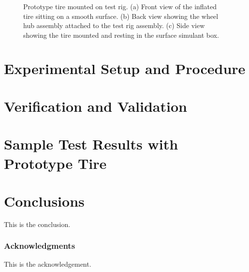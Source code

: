 \documentclass{article}
\begin{document}
\begin{figure}[hbt!]
\begin{minipage}{0.32\textwidth}
    \end{minipage}
        \begin{minipage}{0.32\textwidth}
        \centering
    \end{minipage}
    \caption{Prototype tire mounted on test rig. (a) Front view of the inflated tire sitting on a smooth surface. (b) Back view showing the wheel hub assembly attached to the test rig assembly. (c) Side view showing the tire mounted and resting in the surface simulant box.}
    \label{tire_on_rig}
\end{figure}

\section{Experimental Setup and Procedure}


\section{Verification and Validation}


\section{Sample Test Results with Prototype Tire}

\section{Conclusions}

This is the conclusion.

\subsubsection*{Acknowledgments}
This is the acknowledgement.




\end{document}
